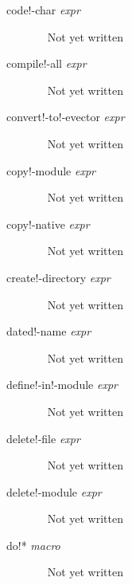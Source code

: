 \documentclass[a4paper,11pt]{article}
\begin{document}
\begin{description}
\item [{\ttfamily code!-char} {\itshape  expr}]  ~\newline
Not yet written

\item [{\ttfamily compile!-all} {\itshape  expr}]  ~\newline
Not yet written

\item [{\ttfamily convert!-to!-evector} {\itshape  expr}]  ~\newline
Not yet written

\item [{\ttfamily copy!-module} {\itshape  expr}]  ~\newline
Not yet written

\item [{\ttfamily copy!-native} {\itshape  expr}]  ~\newline
Not yet written

\item [{\ttfamily create!-directory} {\itshape  expr}]  ~\newline
Not yet written

\item [{\ttfamily dated!-name} {\itshape  expr}]  ~\newline
Not yet written

\item [{\ttfamily define!-in!-module} {\itshape  expr}]  ~\newline
Not yet written

\item [{\ttfamily delete!-file} {\itshape  expr}]  ~\newline
Not yet written

\item [{\ttfamily delete!-module} {\itshape  expr}]  ~\newline
Not yet written

\item [{\ttfamily do!*} {\itshape macro}]  ~\newline
Not yet written


\end{description}
\end{document}
